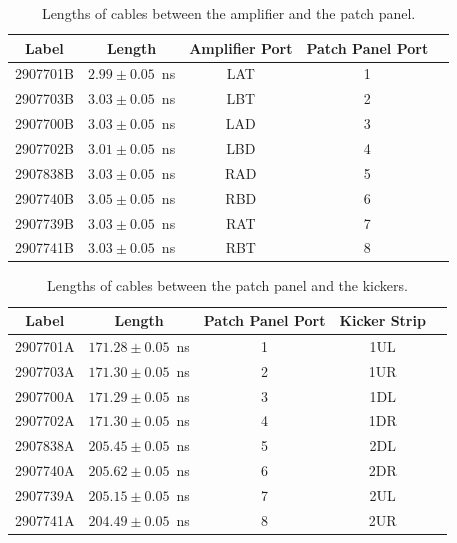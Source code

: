 \begin{table}
  \begin{center}
    \begin{tabular}{| c | c | c | c | c |}
	   \hline
       Label & Length & Amplifier Port & Patch Panel Port \\ \hline
       2907701B & \(2.99\pm0.05\)~ns & LAT & 1 \\
       2907703B & \(3.03\pm0.05\)~ns & LBT & 2 \\
       2907700B & \(3.03\pm0.05\)~ns & LAD & 3 \\
       2907702B & \(3.01\pm0.05\)~ns & LBD & 4 \\
       2907838B & \(3.03\pm0.05\)~ns & RAD & 5 \\
       2907740B & \(3.05\pm0.05\)~ns & RBD & 6 \\
       2907739B & \(3.03\pm0.05\)~ns & RAT & 7 \\
       2907741B & \(3.03\pm0.05\)~ns & RBT & 8 \\
 	   \hline
    \end{tabular}
    \caption{Lengths of cables between the amplifier and the patch panel.}
  	\label{t:shortCabLengths}
  \end{center}
\end{table}

\begin{table}
  \begin{center}
    \begin{tabular}{| c | c | c | c | c |}
	   \hline
       Label & Length & Patch Panel Port & Kicker Strip \\ \hline
       2907701A & \(171.28\pm0.05\)~ns & 1 & 1UL \\
       2907703A & \(171.30\pm0.05\)~ns & 2 & 1UR \\
       2907700A & \(171.29\pm0.05\)~ns & 3 & 1DL \\
       2907702A & \(171.30\pm0.05\)~ns & 4 & 1DR \\
       2907838A & \(205.45\pm0.05\)~ns & 5 & 2DL \\
       2907740A & \(205.62\pm0.05\)~ns & 6 & 2DR \\
       2907739A & \(205.15\pm0.05\)~ns & 7 & 2UL \\
       2907741A & \(204.49\pm0.05\)~ns & 8 & 2UR \\
 	   \hline
    \end{tabular}
    \caption{Lengths of cables between the patch panel and the kickers.}
  	\label{t:kickCabLengths}
  \end{center}
\end{table}


